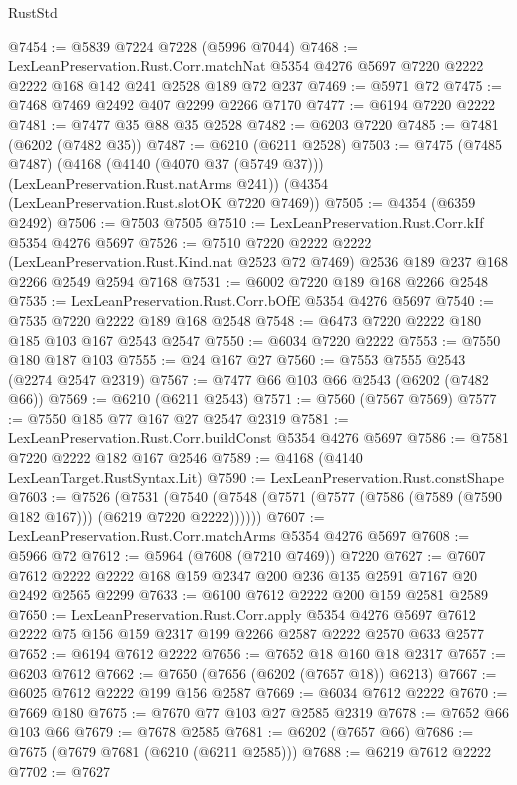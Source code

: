 \begin{lexlean}{RustStd}
\begin{coremodule}
@7454 := @5839 @7224 @7228 (@5996 @7044)
@7468 := LexLeanPreservation.Rust.Corr.matchNat
    @5354
    @4276
    @5697
    @7220
    @2222
    @2222
    @168
    @142
    @241
    @2528
    @189
    @72
    @237
@7469 := @5971 @72
@7475 := @7468 @7469 @2492 @407 @2299 @2266 @7170
@7477 := @6194 @7220 @2222
@7481 := @7477 @35 @88 @35 @2528
@7482 := @6203 @7220
@7485 := @7481 (@6202 (@7482 @35))
@7487 := @6210 (@6211 @2528)
@7503 := @7475
    (@7485 @7487)
    (@4168 (@4140 (@4070 @37 (@5749 @37))) (LexLeanPreservation.Rust.natArms @241))
    (@4354 (LexLeanPreservation.Rust.slotOK @7220 @7469))
@7505 := @4354 (@6359 @2492)
@7506 := @7503 @7505
@7510 := LexLeanPreservation.Rust.Corr.kIf @5354 @4276 @5697
@7526 := @7510
    @7220
    @2222
    @2222
    (LexLeanPreservation.Rust.Kind.nat @2523 @72 @7469)
    @2536
    @189
    @237
    @168
    @2266
    @2549
    @2594
    @7168
@7531 := @6002 @7220 @189 @168 @2266 @2548
@7535 := LexLeanPreservation.Rust.Corr.bOfE @5354 @4276 @5697
@7540 := @7535 @7220 @2222 @189 @168 @2548
@7548 := @6473 @7220 @2222 @180 @185 @103 @167 @2543 @2547
@7550 := @6034 @7220 @2222
@7553 := @7550 @180 @187 @103
@7555 := @24 @167 @27
@7560 := @7553 @7555 @2543 (@2274 @2547 @2319)
@7567 := @7477 @66 @103 @66 @2543 (@6202 (@7482 @66))
@7569 := @6210 (@6211 @2543)
@7571 := @7560 (@7567 @7569)
@7577 := @7550 @185 @77 @167 @27 @2547 @2319
@7581 := LexLeanPreservation.Rust.Corr.buildConst @5354 @4276 @5697
@7586 := @7581 @7220 @2222 @182 @167 @2546
@7589 := @4168 (@4140 LexLeanTarget.RustSyntax.Lit)
@7590 := LexLeanPreservation.Rust.constShape
@7603 := @7526
    (@7531 (@7540 (@7548 (@7571 (@7577 (@7586 (@7589 (@7590 @182 @167))) (@6219 @7220 @2222))))))
@7607 := LexLeanPreservation.Rust.Corr.matchArms @5354 @4276 @5697
@7608 := @5966 @72
@7612 := @5964 (@7608 (@7210 @7469)) @7220
@7627 := @7607 @7612 @2222 @2222 @168 @159 @2347 @200 @236 @135 @2591 @7167 @20 @2492 @2565 @2299
@7633 := @6100 @7612 @2222 @200 @159 @2581 @2589
@7650 := LexLeanPreservation.Rust.Corr.apply
    @5354
    @4276
    @5697
    @7612
    @2222
    @75
    @156
    @159
    @2317
    @199
    @2266
    @2587
    @2222
    @2570
    @633
    @2577
@7652 := @6194 @7612 @2222
@7656 := @7652 @18 @160 @18 @2317
@7657 := @6203 @7612
@7662 := @7650 (@7656 (@6202 (@7657 @18)) @6213)
@7667 := @6025 @7612 @2222 @199 @156 @2587
@7669 := @6034 @7612 @2222
@7670 := @7669 @180
@7675 := @7670 @77 @103 @27 @2585 @2319
@7678 := @7652 @66 @103 @66
@7679 := @7678 @2585
@7681 := @6202 (@7657 @66)
@7686 := @7675 (@7679 @7681 (@6210 (@6211 @2585)))
@7688 := @6219 @7612 @2222
@7702 := @7627

\end{coremodule}
\end{lexlean}

